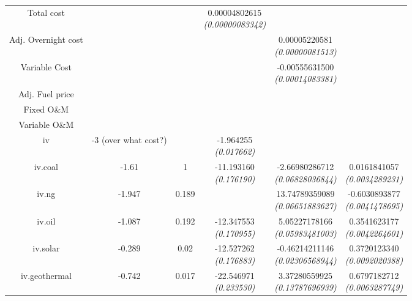 \documentclass[10pt]{amsart}
\begin{document}
\begin{table}[H]
\begin{tabular}{c c c c c c}
Total cost & & & \makecell{0.00004802615 \\ {\footnotesize\textit{(0.00000083342)}}} & & \\
Adj. Overnight cost & & & & \makecell{0.00005220581 \\ {\footnotesize\textit{(0.00000081513)}}} & \\
Variable Cost & & & & \makecell{-0.00555631500 \\ {\footnotesize\textit{(0.00014083381)}}} & \\
Adj. Fuel price & & & & & \\
Fixed O\&M & & & & & \\
Variable O\&M & & & & & \\
\hline
iv & -3 \footnotesize{(over what cost?)} &  & \makecell{-1.964255 \\ {\footnotesize\textit{(0.017662)}}} & & \\
iv.coal & -1.61 & 1 & \makecell{-11.193160 \\ {\footnotesize\textit{(0.176190)}}} & \makecell{-2.66980286712 \\ {\footnotesize\textit{(0.06828036844)}}} & \makecell{0.0161841057 \\ {\footnotesize\textit{(0.0034289231)}}} \\
iv.ng & -1.947 & 0.189 & & \makecell{13.74789359089 \\ {\footnotesize\textit{(0.06651883627)}}} & \makecell{-0.6030893877 \\ {\footnotesize\textit{(0.0041478695)}}} \\
iv.oil & -1.087 & 0.192 & \makecell{-12.347553 \\ {\footnotesize\textit{(0.170955)}}} & \makecell{5.05227178166 \\ {\footnotesize\textit{(0.05983481003)}}} & \makecell{0.3541623177 \\ {\footnotesize\textit{(0.0042264601)}}} \\
iv.solar & -0.289 & 0.02 & \makecell{-12.527262 \\ {\footnotesize\textit{(0.176883)}}} & \makecell{-0.46214211146 \\ {\footnotesize\textit{(0.02306568944)}}} & \makecell{0.3720123340 \\ {\footnotesize\textit{(0.0092020388)}}} \\
iv.geothermal & -0.742 & 0.017 & \makecell{-22.546971 \\ {\footnotesize\textit{(0.233530)}}} & \makecell{3.37280559925 \\ {\footnotesize\textit{(0.13787696939)}}} & \makecell{0.6797182712 \\ {\footnotesize\textit{(0.0063287749)}}} \\

\end{tabular}
\end{table}
\end{document}
